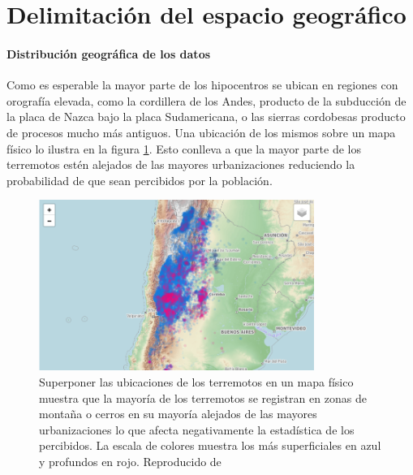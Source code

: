 \documentclass[a4paper]{report}
\begin{document}
\section{Delimitación del espacio geográfico}\label{sec:geográfico}

\paragraph{Distribución geográfica de los datos}
Como es esperable la mayor parte de los hipocentros se ubican en regiones con orografía elevada, como la cordillera de los Andes, producto de la subducción de la placa de Nazca bajo la placa Sudamericana, o las sierras cordobesas producto de procesos mucho más antiguos. 
Una ubicación de los mismos sobre un mapa físico lo ilustra en la figura \ref{fig:mapa_sismos}.
Esto conlleva a que la mayor parte de los terremotos estén alejados de las mayores urbanizaciones reduciendo la probabilidad de que sean percibidos por la población.
\begin{figure}[!ht]
\centering
\includegraphics[width=0.8\textwidth]{mapa_sismos.png}
\caption{Superponer las ubicaciones de los terremotos en un mapa físico muestra que la mayoría de los terremotos se registran en zonas de montaña o cerros en su mayoría alejados de las mayores urbanizaciones lo que afecta negativamente la estadística de los percibidos.
La escala de colores muestra los más superficiales en azul y profundos en rojo.
Reproducido de \cite{daniela_parada_ic-datasets-docencia_nodate}}
\label{fig:mapa_sismos}
\end{figure}
\end{document}
